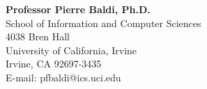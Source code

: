 \documentclass[margin,line]{res}
\begin{document}
\begin{resume}
\textbf{Professor Pierre Baldi, Ph.D.}\\
School of Information and Computer Sciences\\
4038 Bren Hall\\
University of California, Irvine\\
Irvine, CA 92697-3435\\
E-mail: pfbaldi@ics.uci.edu\\

\end{resume}
\end{document}

